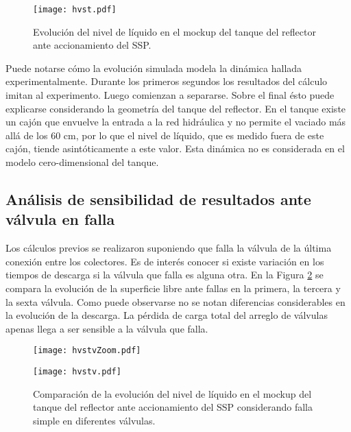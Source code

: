 
\begin{figure}['ht]
\centering
\texttt{[image: hvst.pdf]}
\caption{Evolución del nivel de líquido en el mockup del tanque del reflector ante accionamiento del SSP.} \label{hvst} 
\end{figure}

Puede notarse cómo la evolución simulada modela la dinámica hallada experimentalmente.
Durante los primeros segundos los resultados del cálculo imitan al experimento.
Luego comienzan a separarse. 
Sobre el final ésto puede explicarse considerando la geometría del tanque del reflector.
En el tanque existe un cajón que envuelve la entrada a la red hidráulica y no permite el vaciado más allá de los 60 cm,
por lo que el nivel de líquido, que es medido fuera de este cajón, tiende asintóticamente a este valor.
Esta dinámica no es considerada en el modelo cero-dimensional del tanque.

\subsection*{Análisis de sensibilidad de resultados ante válvula en falla}

Los cálculos previos se realizaron suponiendo que falla la válvula de la última conexión entre los colectores.
Es de interés conocer si existe variación en los tiempos de descarga si la válvula que falla es alguna otra.
En la Figura \ref{hvstv} se compara la evolución de la superficie libre ante fallas en la primera, la tercera y la sexta válvula.
Como puede observarse no se notan diferencias considerables en la evolución de la descarga.
La pérdida de carga total del arreglo de válvulas apenas llega a ser sensible a la válvula que falla.

\begin{figure}['ht]
	\begin{minipage}{0.5\linewidth}
		\centering
		\texttt{[image: hvstvZoom.pdf]}
	\end{minipage}
	\begin{minipage}{0.5\linewidth}
		\centering
		\texttt{[image: hvstv.pdf]}
	\end{minipage}
	\caption{Comparación de la evolución del nivel de líquido en el mockup del tanque del reflector ante accionamiento del SSP
  considerando falla simple en diferentes válvulas.}  
	\label{hvstv}
\end{figure}

